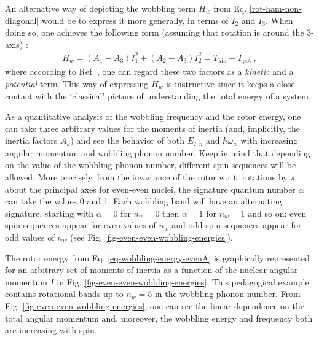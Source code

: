 An alternative way of depicting the wobbling term $H_w$ from Eq. \ref{rot-ham-non-diagonal} would be to express it more generally, in terms of $I_2$ and $I_3$. When doing so, one achieves the following form (assuming that rotation is around the $3$-axis) \cite{oi2006semi}:
\begin{align}
    H_w=(A_1-A_3)I_1^2+(A_2-A_3)I_2^2=T_\text{kin}+T_\text{pot}\ ,
\end{align}
where according to Ref. \cite{wen2015wobbling}, one can regard these two factors as a \emph{kinetic} and a \emph{potential} term. This way of expressing $H_w$ is instructive since it keeps a close contact with the `classical' picture of understanding the total energy of a system.

As a quantitative analysis of the wobbling frequency and the rotor energy, one can take three arbitrary values for the moments of inertia (and, implicitly, the inertia factors $A_k$) and see the behavior of both $E_{I,n}$ and $\hbar\omega_w$ with increasing angular momentum and wobbling phonon number. Keep in mind that depending on the value of the wobbling phonon number, different spin sequences will be allowed. More precisely, from the invariance of the rotor w.r.t. rotations by $\pi$ about the principal axes for even-even nuclei, the signature quantum number $\alpha$ can take the values 0 and 1. Each wobbling band will have an alternating signature, starting with $\alpha=0$ for $n_w=0$ then $\alpha=1$ for $n_w=1$ and so on: even spin sequences appear for even values of $n_w$ and odd spin sequences appear for odd values of $n_w$ (see Fig. \ref{fig-even-even-wobbling-energies}).

The rotor energy from Eq. \ref{eq-wobbling-energy-evenA} is graphically represented for an arbitrary set of moments of inertia as a function of the nuclear angular momentum $I$ in Fig. \ref{fig-even-even-wobbling-energies}. This pedagogical example contains rotational bands up to $n_w=5$ in the wobbling phonon number. From Fig. \ref{fig-even-even-wobbling-energies}, one can see the linear dependence on the total angular momentum and, moreover, the wobbling energy and frequency both are increasing with spin.

